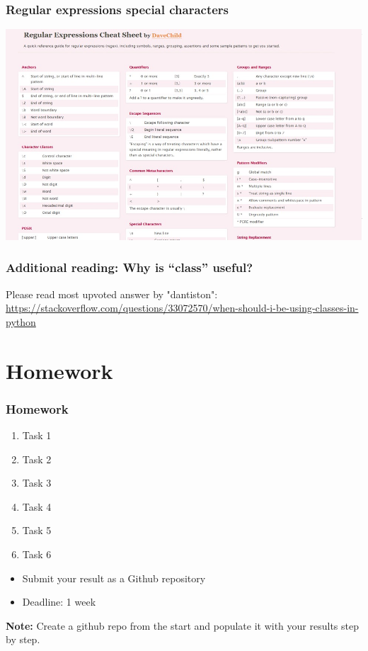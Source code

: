 \documentclass{beamer}
\begin{document}
\begin{frame}
    \frametitle{Regular expressions special characters}
            \centering
            \includegraphics[scale=0.5]{figures/regex.jpg}
\end{frame}

\begin{frame}
    \frametitle{Additional reading: Why is “class” useful?}
    Please read most upvoted answer by "dantiston":
     \url{https://stackoverflow.com/questions/33072570/when-should-i-be-using-classes-in-python} 
\end{frame}

\section{Homework} 

\begin{frame}
    \frametitle{Homework}
    \begin{enumerate}
        \item Task 1
        \item Task 2
        \item Task 3
        \item Task 4
        \item Task 5
        \item Task 6
    \end{enumerate}

    \vskip 2mm
    \begin{itemize}
        \item Submit your result as a Github repository
        \item Deadline: 1 week %
    \end{itemize}

\vfill
\textbf{Note:} Create a github repo from the start and populate it with your results step by step.
\end{frame}
\end{document}
